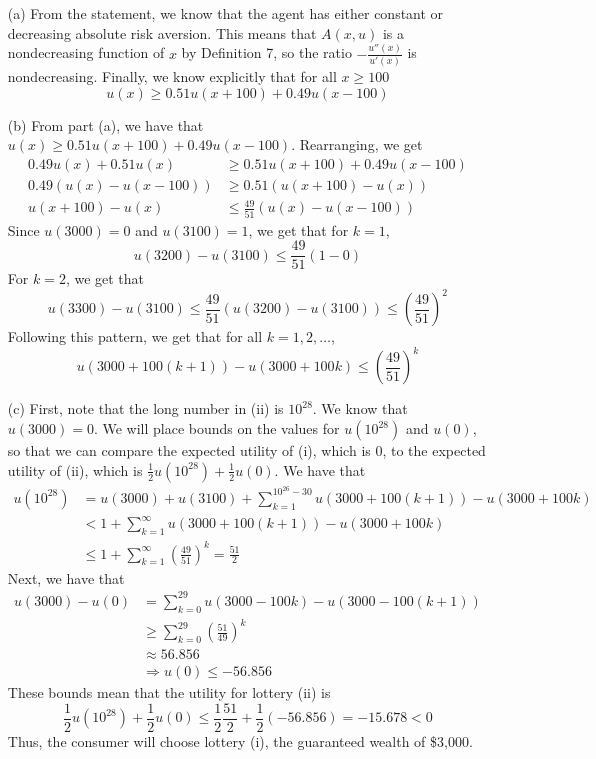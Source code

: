 \documentclass[12pt]{article}
\begin{document}
\begin{itemize}
    \item[(a)] From the statement, we know that the agent has either constant or decreasing absolute risk aversion. This means that $A(x,u)$ is a nondecreasing function of $x$ by Definition 7, so the ratio $-\frac{u''(x)}{u'(x)}$ is nondecreasing. Finally, we know explicitly that for all $x \ge 100$
    \[
    u(x) \ge 0.51 u(x + 100) + 0.49 u(x - 100)
    \]

    \item[(b)] From part (a), we have that $u(x) \ge 0.51 u(x + 100) + 0.49 u(x - 100)$. Rearranging, we get
    \begin{align*}
        0.49 u(x) + 0.51 u(x) &\ge 0.51 u(x + 100) + 0.49 u(x - 100) \\
        0.49(u(x) - u(x-100)) &\ge 0.51(u(x+100)-u(x)) \\
        u(x+100) - u(x) &\le \frac{49}{51} (u(x) - u(x-100))
    \end{align*}
    Since $u(3000) = 0$ and $u(3100) = 1$, we get that for $k = 1$,
    \[
    u(3200) - u(3100) \le \frac{49}{51} (1 - 0)
    \]
    For $k = 2$, we get that
    \[
    u(3300) - u(3100) \le \frac{49}{51} (u(3200) - u(3100)) \le \left(\frac{49}{51} \right)^2
    \]
    Following this pattern, we get that for all $k = 1,2,\dots$,
    \[
    u(3000 + 100(k+1)) - u(3000 + 100k) \le \left(\frac{49}{51} \right)^k
    \]
    

    \item[(c)] First, note that the long number in (ii) is $10^{28}$. We know that $u(3000) = 0$. We will place bounds on the values for $u(10^{28})$ and $u(0)$, so that we can compare the expected utility of (i), which is 0, to the expected utility of (ii), which is $\frac{1}{2}u(10^{28}) + \frac{1}{2}u(0)$. We have that
    \begin{align*}
        u(10^{28}) &= u(3000) + u(3100) + \sum_{k=1}^{10^{26}-30} u(3000 + 100(k+1)) - u(3000 + 100k) \\
        &< 1 + \sum_{k=1}^{\infty} u(3000 + 100(k+1)) - u(3000 + 100k) \\
        &\le 1 + \sum_{k=1}^\infty \left(\frac{49}{51}\right)^k = \frac{51}{2}
    \end{align*}
    Next, we have that
    \begin{align*}
        u(3000) - u(0) &=\sum_{k=0}^{29} u(3000 - 100k) - u(3000 - 100(k+1)) \\
        &\ge \sum_{k=0}^{29} \left(\frac{51}{49}\right)^k\\
        &\approx 56.856 \\
        &\Longrightarrow u(0) \le -56.856
    \end{align*}
    These bounds mean that the utility for lottery (ii) is 
    \[
    \frac{1}{2}u(10^{28}) + \frac{1}{2}u(0) \le \frac{1}{2}\frac{51}{2} + \frac{1}{2}(-56.856) = -15.678 < 0
    \]
    Thus, the consumer will choose lottery (i), the guaranteed wealth of \$3,000.


\end{itemize}
\end{document}
